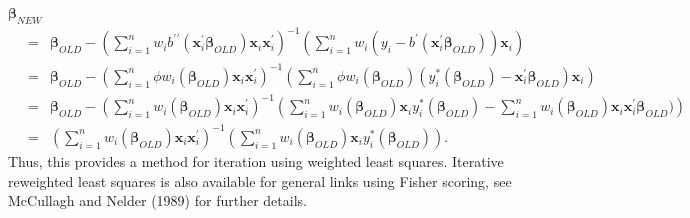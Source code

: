 \noindent $\boldsymbol \beta_{NEW}$
\begin{eqnarray*}
~ &=& \boldsymbol \beta_{OLD} -  \left( \sum_{i=1}^n w_i b^{\prime
\prime}(\mathbf{x}_i^{\prime} \boldsymbol \beta _{OLD}) \mathbf{x}_i
\mathbf{x}_i^{\prime} \right)^{-1} \left( \sum_{i=1}^n w_i (y_i -
b^{\prime}(\mathbf{x}_i^{\prime} \boldsymbol
\beta_{OLD})) \mathbf{x}_i \right) \\
&=& \boldsymbol \beta_{OLD} -  \left( \sum_{i=1}^n \phi
w_i(\boldsymbol \beta _{OLD}) \mathbf{x}_i \mathbf{x}_i^{\prime}
\right)^{-1} \left( \sum_{i=1}^n \phi w_i(\boldsymbol \beta _{OLD})
(y_i^{\ast}(\boldsymbol \beta_{OLD}) - \mathbf{x}_i^{\prime}
\boldsymbol \beta_{OLD})\mathbf{x}_i \right) \\
&=& \boldsymbol \beta_{OLD} -  \left( \sum_{i=1}^n w_i(\boldsymbol
\beta _{OLD}) \mathbf{x}_i \mathbf{x}_i^{\prime} \right)^{-1} \left(
\sum_{i=1}^n  w_i(\boldsymbol \beta _{OLD})\mathbf{x}_i
y_i^{\ast}(\boldsymbol \beta_{OLD}) - \sum_{i=1}^n w_i(\boldsymbol
\beta _{OLD})\mathbf{x}_i
\mathbf{x}_i^{\prime} \boldsymbol \beta_{OLD}) \right) \\
&=& \left( \sum_{i=1}^n  w_i(\boldsymbol \beta _{OLD}) \mathbf{x}_i
\mathbf{x}_i^{\prime} \right)^{-1} \left( \sum_{i=1}^n
w_i(\boldsymbol \beta _{OLD})\mathbf{x}_i y_i^{\ast}(\boldsymbol
\beta_{OLD})  \right).
  \end{eqnarray*}
Thus, this provides a method for iteration using weighted least
squares. Iterative reweighted least squares is also available for
general links using Fisher scoring, see McCullagh and Nelder (1989)
for further details.
